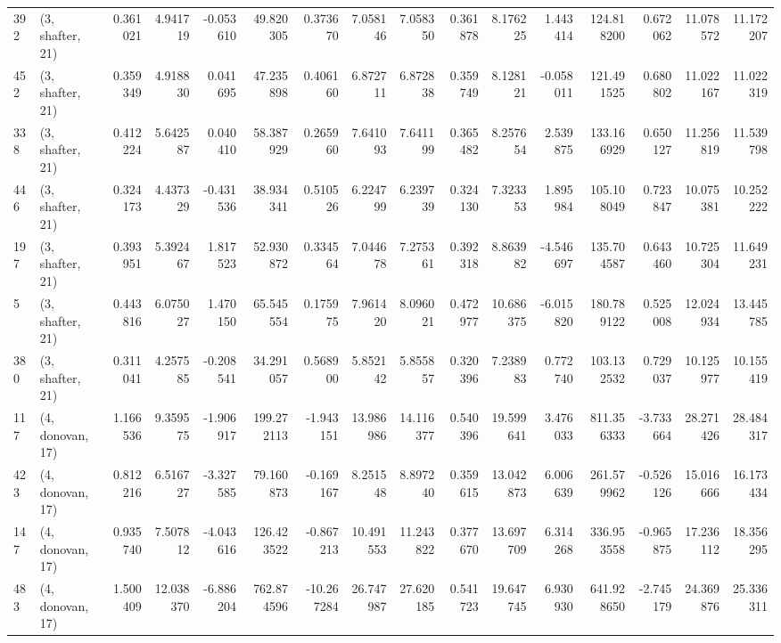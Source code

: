 \begin{tabular}{llrrrrrrrrrrrrrr}
392 &  (3, shafter, 21) &   0.361021 &   4.941719 &  -0.053610 &    49.820305 &   0.373670 &   7.058146 &   7.058350 &  0.361878 &   8.176225 &   1.443414 &   124.818200 &   0.672062 &  11.078572 &  11.172207 \\
452 &  (3, shafter, 21) &   0.359349 &   4.918830 &   0.041695 &    47.235898 &   0.406160 &   6.872711 &   6.872838 &  0.359749 &   8.128121 &  -0.058011 &   121.491525 &   0.680802 &  11.022167 &  11.022319 \\
338 &  (3, shafter, 21) &   0.412224 &   5.642587 &   0.040410 &    58.387929 &   0.265960 &   7.641093 &   7.641199 &  0.365482 &   8.257654 &   2.539875 &   133.166929 &   0.650127 &  11.256819 &  11.539798 \\
446 &  (3, shafter, 21) &   0.324173 &   4.437329 &  -0.431536 &    38.934341 &   0.510526 &   6.224799 &   6.239739 &  0.324130 &   7.323353 &   1.895984 &   105.108049 &   0.723847 &  10.075381 &  10.252222 \\
197 &  (3, shafter, 21) &   0.393951 &   5.392467 &   1.817523 &    52.930872 &   0.334564 &   7.044678 &   7.275361 &  0.392318 &   8.863982 &  -4.546697 &   135.704587 &   0.643460 &  10.725304 &  11.649231 \\
5   &  (3, shafter, 21) &   0.443816 &   6.075027 &   1.470150 &    65.545554 &   0.175975 &   7.961420 &   8.096021 &  0.472977 &  10.686375 &  -6.015820 &   180.789122 &   0.525008 &  12.024934 &  13.445785 \\
380 &  (3, shafter, 21) &   0.311041 &   4.257585 &  -0.208541 &    34.291057 &   0.568900 &   5.852142 &   5.855857 &  0.320396 &   7.238983 &   0.772740 &   103.132532 &   0.729037 &  10.125977 &  10.155419 \\
117 &  (4, donovan, 17) &   1.166536 &   9.359575 &  -1.906917 &   199.272113 &  -1.943151 &  13.986986 &  14.116377 &  0.540396 &  19.599641 &   3.476033 &   811.356333 &  -3.733664 &  28.271426 &  28.484317 \\
423 &  (4, donovan, 17) &   0.812216 &   6.516727 &  -3.327585 &    79.160873 &  -0.169167 &   8.251548 &   8.897240 &  0.359615 &  13.042873 &   6.006639 &   261.579962 &  -0.526126 &  15.016666 &  16.173434 \\
147 &  (4, donovan, 17) &   0.935740 &   7.507812 &  -4.043616 &   126.423522 &  -0.867213 &  10.491553 &  11.243822 &  0.377670 &  13.697709 &   6.314268 &   336.953558 &  -0.965875 &  17.236112 &  18.356295 \\
483 &  (4, donovan, 17) &   1.500409 &  12.038370 &  -6.886204 &   762.874596 & -10.267284 &  26.747987 &  27.620185 &  0.541723 &  19.647745 &   6.930930 &   641.928650 &  -2.745179 &  24.369876 &  25.336311 \\

\end{tabular}
